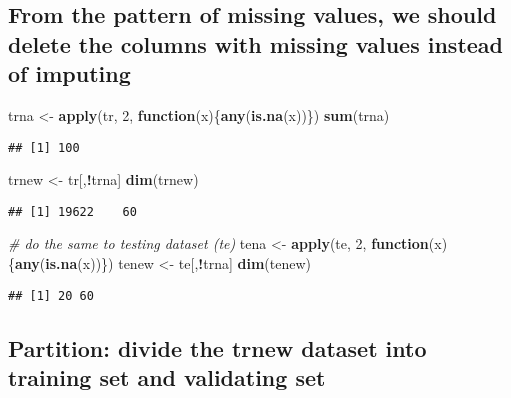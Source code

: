 \documentclass[]{article}
\newenvironment{Shaded}{\begin{snugshade}}{\end{snugshade}}
\newcommand{\CommentTok}[1]{\textcolor[rgb]{0.56,0.35,0.01}{\textit{#1}}}
\newcommand{\ControlFlowTok}[1]{\textcolor[rgb]{0.13,0.29,0.53}{\textbf{#1}}}
\newcommand{\DecValTok}[1]{\textcolor[rgb]{0.00,0.00,0.81}{#1}}
\newcommand{\KeywordTok}[1]{\textcolor[rgb]{0.13,0.29,0.53}{\textbf{#1}}}
\newcommand{\NormalTok}[1]{#1}
\newcommand{\OperatorTok}[1]{\textcolor[rgb]{0.81,0.36,0.00}{\textbf{#1}}}
\newcommand{\StringTok}[1]{\textcolor[rgb]{0.31,0.60,0.02}{#1}}
\begin{document}
\hypertarget{from-the-pattern-of-missing-values-we-should-delete-the-columns-with-missing-values-instead-of-imputing}{%
\subsection{From the pattern of missing values, we should delete the
columns with missing values instead of
imputing}\label{from-the-pattern-of-missing-values-we-should-delete-the-columns-with-missing-values-instead-of-imputing}}

\begin{Shaded}
\begin{Highlighting}[]
\NormalTok{trna <-}\StringTok{ }\KeywordTok{apply}\NormalTok{(tr, }\DecValTok{2}\NormalTok{, }\ControlFlowTok{function}\NormalTok{(x)\{}\KeywordTok{any}\NormalTok{(}\KeywordTok{is.na}\NormalTok{(x))\})}
\KeywordTok{sum}\NormalTok{(trna)}
\end{Highlighting}
\end{Shaded}

\begin{verbatim}
## [1] 100
\end{verbatim}

\begin{Shaded}
\begin{Highlighting}[]
\NormalTok{trnew <-}\StringTok{ }\NormalTok{tr[,}\OperatorTok{!}\NormalTok{trna]}
\KeywordTok{dim}\NormalTok{(trnew)}
\end{Highlighting}
\end{Shaded}

\begin{verbatim}
## [1] 19622    60
\end{verbatim}

\begin{Shaded}
\begin{Highlighting}[]
\CommentTok{# do the same to testing dataset (te)}
\NormalTok{tena <-}\StringTok{ }\KeywordTok{apply}\NormalTok{(te, }\DecValTok{2}\NormalTok{, }\ControlFlowTok{function}\NormalTok{(x)\{}\KeywordTok{any}\NormalTok{(}\KeywordTok{is.na}\NormalTok{(x))\})}
\NormalTok{tenew <-}\StringTok{ }\NormalTok{te[,}\OperatorTok{!}\NormalTok{trna]}
\KeywordTok{dim}\NormalTok{(tenew)}
\end{Highlighting}
\end{Shaded}

\begin{verbatim}
## [1] 20 60
\end{verbatim}

\hypertarget{partition-divide-the-trnew-dataset-into-training-set-and-validating-set}{%
\subsection{Partition: divide the trnew dataset into training set and
validating
set}\label{partition-divide-the-trnew-dataset-into-training-set-and-validating-set}}
\end{document}
